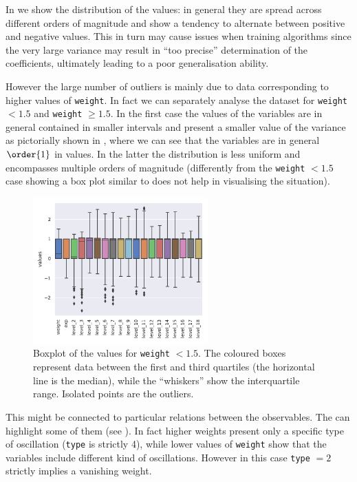 In  we show the distribution of the values: in general they are spread across different orders of magnitude and show a tendency to alternate between positive and negative values.
This in turn may cause issues when training \ml algorithms since the very large variance may result in ``too precise'' determination of the coefficients, ultimately leading to a poor generalisation ability.

However the large number of outliers is mainly due to data corresponding to higher values of \texttt{weight}.
In fact we can separately analyse the dataset for \texttt{weight} $< 1.5$ and \texttt{weight} $\ge 1.5$.
In the first case the values of the variables are in general contained in smaller intervals and present a smaller value of the variance as pictorially shown in , where we can see that the variables are in general $\order{1}$ in values.
In the latter the distribution is less uniform and encompasses multiple orders of magnitude (differently from the \texttt{weight} $< 1.5$ case showing a box plot similar to  does not help in visualising the situation).

\begin{figure}[htbp]
  \centering
  \includegraphics[width=0.6\textwidth]{img/boxplot_low}
  \caption{%
    Boxplot of the values for \texttt{weight} $< 1.5$.
    The coloured boxes represent data between the first and third quartiles (the horizontal line is the median), while the ``whiskers'' show the interquartile range.
    Isolated points are the outliers.
  }
  \label{fig:lumps:box}
\end{figure}

This might be connected to particular relations between the observables. The \eda can highlight some of them (see ).
In fact higher weights present only a specific type of oscillation (\texttt{type} is strictly 4), while lower values of \texttt{weight} show that the variables include different kind of oscillations.
However in this case \texttt{type} $= 2$ strictly implies a vanishing weight.

